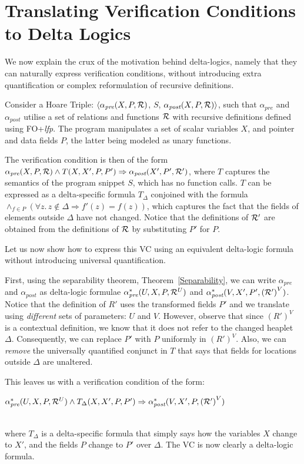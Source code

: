 	\section{Translating Verification Conditions to Delta Logics}
\label{sec:VC2Delta}	
	We now explain the crux of the motivation behind delta-logics, namely that they can naturally express verification conditions,
	without introducing extra quantification or complex reformulation of recursive definitions.
	
Consider a Hoare Triple: $\langle \alpha_{\textit{pre}}(X, P, {\cal R})$, $S$, $\alpha_{\textit{post}}(X, P, {\cal R})\rangle$,
such that $\alpha_{pre}$ and $\alpha_{post}$ utilise a set of relations and functions ${\cal R}$ with recursive definitions defined using FO+\textit{lfp}. 
The program manipulates a set of scalar variables $X$, and pointer and data fields $P$, the latter being modeled as unary functions. 

The verification condition is then of the form $\alpha_{\textit{pre}}(X, P, {\cal R}) \land{} T(X, X', P, P') \Rightarrow 
\alpha_{\textit{post}} (X', P', {\cal R'})$, where $T$ captures the semantics of the program snippet $S$, which has no function calls.
$T$ can be expressed as a delta-specific formula $T_\Delta$ conjoined with the formula 
$\wedge_{f \in{} P} \left(\forall{}z.\,z\notin{}\Delta{} \Rightarrow f'(z) = f(z) \right)$, which captures
the fact that the fields of elements outside $\Delta$ have not changed. Notice that the definitions of ${\cal R'}$ are 
obtained from the definitions of ${\cal R}$ by substituting $P'$ for $P$.

Let us now show how to express this VC using an equivalent delta-logic formula without introducing universal quantification.

First, using the separability theorem, Theorem~\ref{Separability}, we can write $\alpha_{\textit{pre}}$ and $\alpha_{\textit{post}}$
as delta-logic formulae $\alpha_{\textit{pre}}^*(U, X, P, {\cal R}^U)$ and $\alpha_{\textit{post}}^*(V, X', P', {\cal (R')}^V)$.
Notice that the definition of $R'$ uses the transformed fields $P'$ and we translate using \emph{different} sets of parameters: $U$
and $V$. However, observe that since $(R')^V$ is a contextual definition, we know that it does not refer to the changed heaplet
$\Delta$. Consequently, we can replace $P'$ with $P$ uniformly in $(R')^V$. Also, we can \emph{remove} the universally
quantified conjunct in $T$ that says that fields for locations outside $\Delta$ are unaltered.

This leaves us with a verification condition of the form:\\
\centerline{ $\alpha_{\textit{pre}}^*(U, X, P, {\cal R}^U) \wedge 
T_\Delta(X, X', P, P') \Rightarrow \alpha_{\textit{post}}^*(V, X', P, {\cal (R')}^V)$}\\
where $T_\Delta$ is a
delta-specific formula that simply says how the variables $X$ change to $X'$, and the fields $P$ change to $P'$ over $\Delta$.
The VC is now clearly a delta-logic formula.

